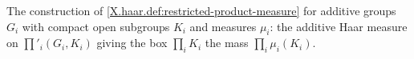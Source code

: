 The construction of \cref{X.haar.def:restricted-product-measure} for additive groups $G_i$ with compact open subgroups $K_i$ and measures $\mu_i$: the additive Haar measure on $\prod'_i(G_i,K_i)$ giving the box $\prod_iK_i$ the mass $\prod_i\mu_i(K_i)$.

